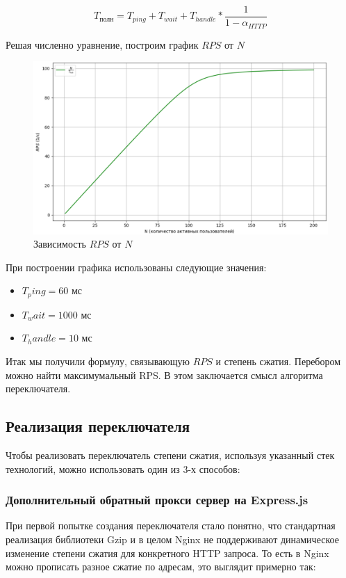 \documentclass[12pt]{article}
\begin{document}
\[
    T_{\text{полн}} = T_{ping} + T_{wait} + T_{handle}*\frac{1}{1 - \alpha_{HTTP}}
\]

Решая численно уравнение, построим график $RPS$ от $N$

\begin{figure}[H]
    \centering
    \includegraphics[width=1\textwidth]{../images/rps-from-n.png}
    \caption{Зависимость $RPS$ от $N$}
\end{figure}

При построении графика использованы следующие значения:

\begin{itemize}
    \item $T_ping = 60   \text{ мс}$ 
    \item $T_wait = 1000 \text{ мс}$ 
    \item $T_handle = 10 \text{ мс}$ 
\end{itemize}

Итак мы получили формулу, связывающую $RPS$ и степень сжатия. Перебором можно найти максимумальный RPS. В этом заключается смысл алгоритма переключателя.

\subsection{Реализация переключателя}

Чтобы реализовать переключатель степени сжатия, используя указанный стек технологий, можно использовать один из 3-х способов:

\subsubsection{Дополнительный обратный прокси сервер на Express.js}

При первой попытке создания переключателя стало понятно, что стандартная реализация библиотеки Gzip и в целом Nginx не поддерживают динамическое изменение степени сжатия для конкретного HTTP запроса. То есть в Nginx можно прописать разное сжатие по адресам, это выглядит примерно так:
\end{document}
